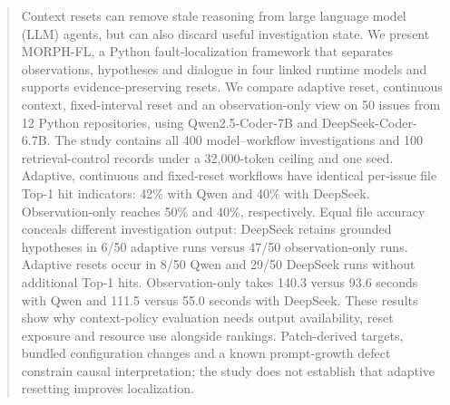 \begin{abstract}
Context resets can remove stale reasoning from large language model (LLM) agents, but can also discard useful investigation state. We present MORPH-FL, a Python fault-localization framework that separates observations, hypotheses and dialogue in four linked runtime models and supports evidence-preserving resets. We compare adaptive reset, continuous context, fixed-interval reset and an observation-only view on 50 issues from 12 Python repositories, using Qwen2.5-Coder-7B and DeepSeek-Coder-6.7B. The study contains all 400 model--workflow investigations and 100 retrieval-control records under a 32,000-token ceiling and one seed. Adaptive, continuous and fixed-reset workflows have identical per-issue file Top-1 hit indicators: 42\% with Qwen and 40\% with DeepSeek. Observation-only reaches 50\% and 40\%, respectively. Equal file accuracy conceals different investigation output: DeepSeek retains grounded hypotheses in 6/50 adaptive runs versus 47/50 observation-only runs. Adaptive resets occur in 8/50 Qwen and 29/50 DeepSeek runs without additional Top-1 hits. Observation-only takes 140.3 versus 93.6 seconds with Qwen and 111.5 versus 55.0 seconds with DeepSeek. These results show why context-policy evaluation needs output availability, reset exposure and resource use alongside rankings. Patch-derived targets, bundled configuration changes and a known prompt-growth defect constrain causal interpretation; the study does not establish that adaptive resetting improves localization.
\end{abstract}

